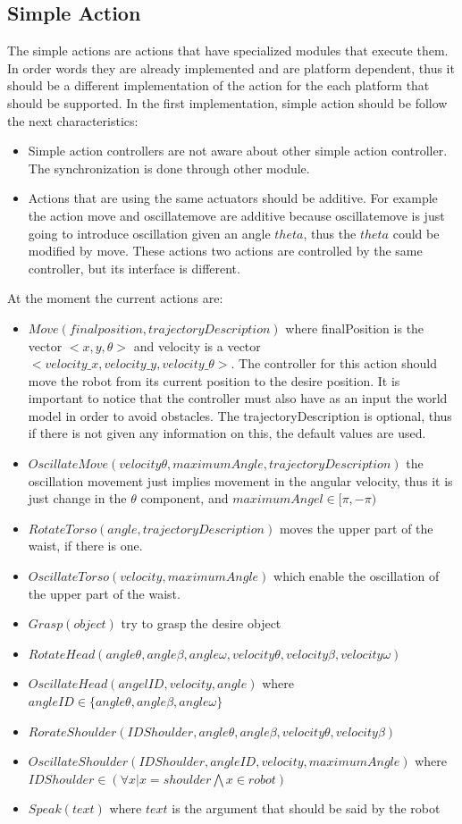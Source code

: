 \subsection{Simple Action}
The simple actions are actions that have specialized modules that execute them. In order words they are already implemented and are platform dependent, thus it should be a different implementation of the action for the each platform that should be supported. In the first implementation, simple action should be follow the next characteristics:
\begin{itemize}
	\item Simple action controllers are not aware about other simple action controller. The synchronization is done through other module.
	\item Actions that are using the same actuators should be additive. For example the action move and oscillatemove are additive because oscillatemove is just going to introduce oscillation given an angle $theta$, thus the $theta$ could be modified by move. These actions two actions are controlled by the same controller, but its interface is different.
\end{itemize} 
At the moment the current actions are:
\begin{itemize}
	\item $Move(finalposition,trajectoryDescription)$ where finalPosition is the vector $<x,y,\theta>$ and velocity is a vector $<velocity\_x,velocity\_y,velocity\_\theta>$. The controller for this action should move the robot from its current position to the desire position. It is important to notice that the controller must also have as an input the world model in order to avoid obstacles. The trajectoryDescription is optional, thus if there is not given any information on this, the default values are used.
	\item $OscillateMove(velocity\theta,maximumAngle,trajectoryDescription)$ the oscillation movement just implies movement in the angular velocity, thus it is just change in the $\theta$ component, and $maximumAngel\in[\pi,-\pi)$
	\item $RotateTorso(angle,trajectoryDescription)$ moves the upper part of the waist, if there is one.
	\item $OscillateTorso(velocity,maximumAngle)$ which enable the oscillation of the upper part of the waist.
	\item $Grasp(object)$ try to grasp the desire object
	\item $RotateHead(angle\theta,angle\beta,angle\omega,velocity\theta,velocity\beta,velocity\omega)$
	\item $OscillateHead(angelID,velocity,angle)$ where\\ $angleID\in \lbrace angle\theta,angle\beta,angle\omega \rbrace$
	\item $RorateShoulder(IDShoulder,angle\theta,angle\beta,velocity\theta,velocity\beta)$
	\item $OscillateShoulder(IDShoulder,angleID,velocity,maximumAngle)$ where\\ $IDShoulder\in (\forall x| x=shoulder\bigwedge x\in robot)$
	\item $Speak(text)$ where $text$ is the argument that should be said by the robot
\end{itemize} 
